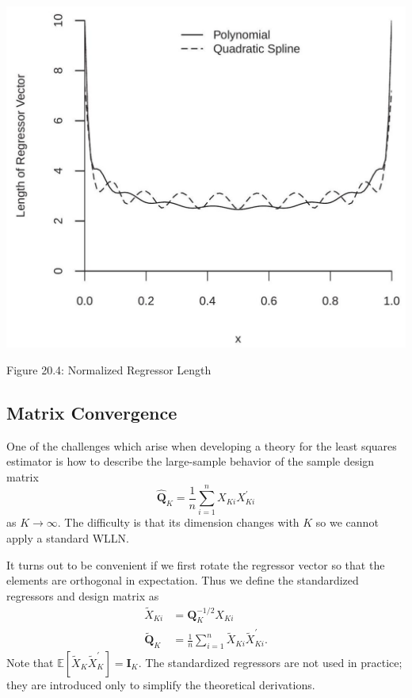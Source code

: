 \documentclass[10pt]{article}
\begin{document}
\includegraphics[max width=\textwidth]{2022_10_23_2b38d6d54e7725c196e7g-12}

Figure 20.4: Normalized Regressor Length

\subsection{Matrix Convergence}
One of the challenges which arise when developing a theory for the least squares estimator is how to describe the large-sample behavior of the sample design matrix
$$
\widehat{\boldsymbol{Q}}_{K}=\frac{1}{n} \sum_{i=1}^{n} X_{K i} X_{K i}^{\prime}
$$
as $K \rightarrow \infty$. The difficulty is that its dimension changes with $K$ so we cannot apply a standard WLLN.

It turns out to be convenient if we first rotate the regressor vector so that the elements are orthogonal in expectation. Thus we define the standardized regressors and design matrix as
$$
\begin{aligned}
\widetilde{X}_{K i} &=\boldsymbol{Q}_{K}^{-1 / 2} X_{K i} \\
\widetilde{\boldsymbol{Q}}_{K} &=\frac{1}{n} \sum_{i=1}^{n} \widetilde{X}_{K i} \widetilde{X}_{K i}^{\prime} .
\end{aligned}
$$
Note that $\mathbb{E}\left[\widetilde{X}_{K} \widetilde{X}_{K}^{\prime}\right]=\boldsymbol{I}_{K}$. The standardized regressors are not used in practice; they are introduced only to simplify the theoretical derivations.
\end{document}
